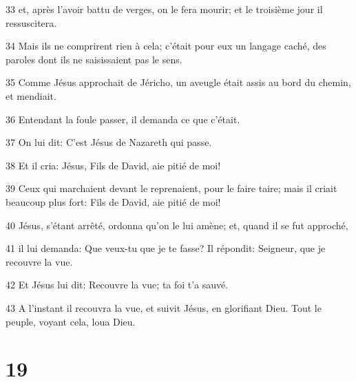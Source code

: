 \par 33 et, après l'avoir battu de verges, on le fera mourir; et le troisième jour il ressuscitera.
\par 34 Mais ils ne comprirent rien à cela; c'était pour eux un langage caché, des paroles dont ils ne saisissaient pas le sens.
\par 35 Comme Jésus approchait de Jéricho, un aveugle était assis au bord du chemin, et mendiait.
\par 36 Entendant la foule passer, il demanda ce que c'était.
\par 37 On lui dit: C'est Jésus de Nazareth qui passe.
\par 38 Et il cria: Jésus, Fils de David, aie pitié de moi!
\par 39 Ceux qui marchaient devant le reprenaient, pour le faire taire; mais il criait beaucoup plus fort: Fils de David, aie pitié de moi!
\par 40 Jésus, s'étant arrêté, ordonna qu'on le lui amène; et, quand il se fut approché,
\par 41 il lui demanda: Que veux-tu que je te fasse? Il répondit: Seigneur, que je recouvre la vue.
\par 42 Et Jésus lui dit: Recouvre la vue; ta foi t'a sauvé.
\par 43 A l'instant il recouvra la vue, et suivit Jésus, en glorifiant Dieu. Tout le peuple, voyant cela, loua Dieu.

\chapter{19}

